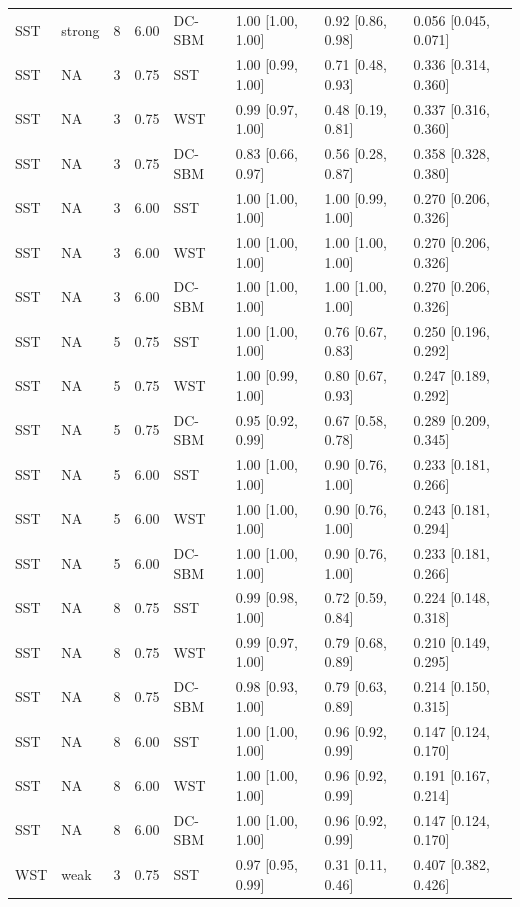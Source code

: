 \begin{table}
\begin{tabular}[t]{llrrllll}
\addlinespace
SST & strong & 8 & 6.00 & DC-SBM & 1.00 [1.00, 1.00] & 0.92 [0.86, 0.98] & 0.056 [0.045, 0.071]\\
SST & NA & 3 & 0.75 & SST & 1.00 [0.99, 1.00] & 0.71 [0.48, 0.93] & 0.336 [0.314, 0.360]\\
SST & NA & 3 & 0.75 & WST & 0.99 [0.97, 1.00] & 0.48 [0.19, 0.81] & 0.337 [0.316, 0.360]\\
SST & NA & 3 & 0.75 & DC-SBM & 0.83 [0.66, 0.97] & 0.56 [0.28, 0.87] & 0.358 [0.328, 0.380]\\
SST & NA & 3 & 6.00 & SST & 1.00 [1.00, 1.00] & 1.00 [0.99, 1.00] & 0.270 [0.206, 0.326]\\
\addlinespace
SST & NA & 3 & 6.00 & WST & 1.00 [1.00, 1.00] & 1.00 [1.00, 1.00] & 0.270 [0.206, 0.326]\\
SST & NA & 3 & 6.00 & DC-SBM & 1.00 [1.00, 1.00] & 1.00 [1.00, 1.00] & 0.270 [0.206, 0.326]\\
SST & NA & 5 & 0.75 & SST & 1.00 [1.00, 1.00] & 0.76 [0.67, 0.83] & 0.250 [0.196, 0.292]\\
SST & NA & 5 & 0.75 & WST & 1.00 [0.99, 1.00] & 0.80 [0.67, 0.93] & 0.247 [0.189, 0.292]\\
SST & NA & 5 & 0.75 & DC-SBM & 0.95 [0.92, 0.99] & 0.67 [0.58, 0.78] & 0.289 [0.209, 0.345]\\
\addlinespace
SST & NA & 5 & 6.00 & SST & 1.00 [1.00, 1.00] & 0.90 [0.76, 1.00] & 0.233 [0.181, 0.266]\\
SST & NA & 5 & 6.00 & WST & 1.00 [1.00, 1.00] & 0.90 [0.76, 1.00] & 0.243 [0.181, 0.294]\\
SST & NA & 5 & 6.00 & DC-SBM & 1.00 [1.00, 1.00] & 0.90 [0.76, 1.00] & 0.233 [0.181, 0.266]\\
SST & NA & 8 & 0.75 & SST & 0.99 [0.98, 1.00] & 0.72 [0.59, 0.84] & 0.224 [0.148, 0.318]\\
SST & NA & 8 & 0.75 & WST & 0.99 [0.97, 1.00] & 0.79 [0.68, 0.89] & 0.210 [0.149, 0.295]\\
\addlinespace
SST & NA & 8 & 0.75 & DC-SBM & 0.98 [0.93, 1.00] & 0.79 [0.63, 0.89] & 0.214 [0.150, 0.315]\\
SST & NA & 8 & 6.00 & SST & 1.00 [1.00, 1.00] & 0.96 [0.92, 0.99] & 0.147 [0.124, 0.170]\\
SST & NA & 8 & 6.00 & WST & 1.00 [1.00, 1.00] & 0.96 [0.92, 0.99] & 0.191 [0.167, 0.214]\\
SST & NA & 8 & 6.00 & DC-SBM & 1.00 [1.00, 1.00] & 0.96 [0.92, 0.99] & 0.147 [0.124, 0.170]\\
WST & weak & 3 & 0.75 & SST & 0.97 [0.95, 0.99] & 0.31 [0.11, 0.46] & 0.407 [0.382, 0.426]\\

\end{tabular}
\end{table}
